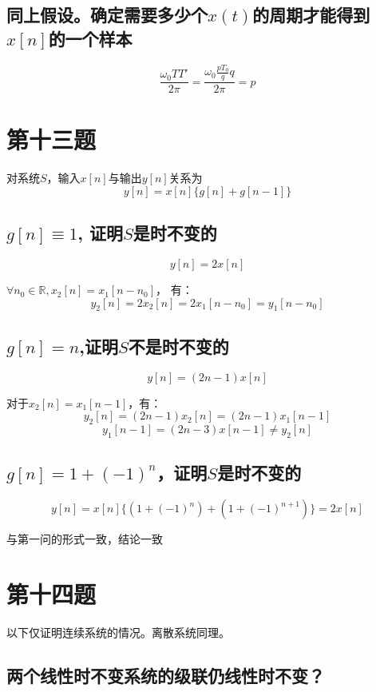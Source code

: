 \documentclass[UTF8, fontset=fandol,12pt, a4paper]{ctexart}
\begin{document}
\subsection{同上假设。确定需要多少个$x(t)$的周期才能得到$x[n]$的一个样本}

$$\frac{\omega_0 T T'}{2\pi} = \frac{\omega_0 \frac{pT_0}{q} q}{2\pi} = p$$

\section* {第十三题}

对系统$S$，输入$x[n]$与输出$y[n]$关系为
$$y[n] = x[n]\{g[n]+g[n-1]\}$$

\subsection{$g[n] \equiv 1$, 证明$S$是时不变的}

$$y[n] = 2x[n]$$

$\forall n_0 \in \mathbb{R}, x_2[n] = x_1[n-n_0]$， 有：
$$y_2[n] = 2x_2[n] = 2x_1[n-n_0] = y_1[n-n_0]$$

\subsection{$g[n] = n$,证明$S$不是时不变的}

$$y[n] = (2n-1)x[n]$$

对于$x_2[n] = x_1[n-1]$，有：
$$y_2[n] = (2n-1)x_2[n] = (2n-1)x_1[n-1]$$ 
$$y_1[n-1] = (2n-3)x[n-1] \ne y_2[n]$$

\subsection{$g[n] = 1+(-1)^n$，证明$S$是时不变的}

$$y[n] = x[n]\{(1+(-1)^n) + (1+(-1)^{n+1})\} = 2x[n]$$

与第一问的形式一致，结论一致

\section* {第十四题}

以下仅证明连续系统的情况。离散系统同理。

\subsection{两个线性时不变系统的级联仍线性时不变？}
\end{document}
